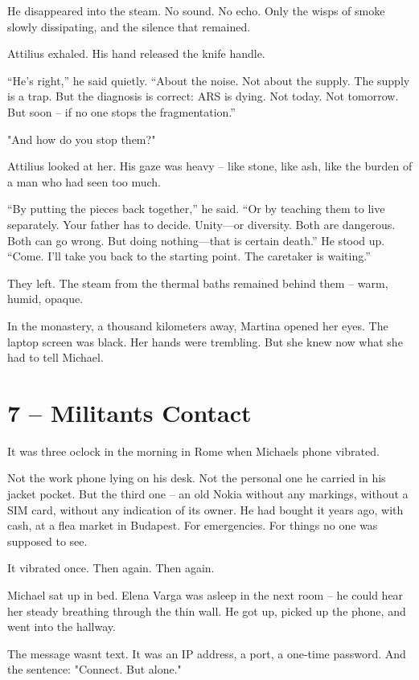 \documentclass[
]{article}
\begin{document}
He disappeared into the steam. No sound. No echo. Only the wisps of smoke slowly dissipating, and the silence that remained.

Attilius exhaled. His hand released the knife handle.

``He's right,'' he said quietly. ``About the noise. Not about the supply. The supply is a trap. But the diagnosis is correct: ARS is dying. Not today. Not tomorrow. But soon -- if no one stops the fragmentation.''

"And how do you stop them?"

Attilius looked at her. His gaze was heavy -- like stone, like ash, like the burden of a man who had seen too much.

``By putting the pieces back together,'' he said. ``Or by teaching them to live separately. Your father has to decide. Unity---or diversity. Both are dangerous. Both can go wrong. But doing nothing---that is certain death.'' He stood up. ``Come. I'll take you back to the starting point. The caretaker is waiting.''

They left. The steam from the thermal baths remained behind them -- warm, humid, opaque.

In the monastery, a thousand kilometers away, Martina opened her eyes. The laptop screen was black. Her hands were trembling. But she knew now what she had to tell Michael.

\section{7 -- Militant\textquotesingle s Contact}\label{militants-contact}

It was three o\textquotesingle clock in the morning in Rome when Michael\textquotesingle s phone vibrated.

Not the work phone lying on his desk. Not the personal one he carried in his jacket pocket. But the third one -- an old Nokia without any markings, without a SIM card, without any indication of its owner. He had bought it years ago, with cash, at a flea market in Budapest. For emergencies. For things no one was supposed to see.

It vibrated once. Then again. Then again.

Michael sat up in bed. Elena Varga was asleep in the next room -- he could hear her steady breathing through the thin wall. He got up, picked up the phone, and went into the hallway.

The message wasn\textquotesingle t text. It was an IP address, a port, a one-time password. And the sentence: "Connect. But alone."
\end{document}
